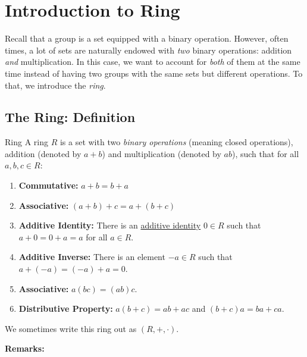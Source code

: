 \documentclass[letterpaper]{article}
\begin{document}
\section{Introduction to Ring}
Recall that a group is a set equipped with a binary operation. However, often times, a lot of sets are naturally endowed with \emph{two} binary operations: addition \emph{and} multiplication. In this case, we want to account for \emph{both} of them at the same time instead of having two groups with the same sets but different operations. To that, we introduce the \emph{ring}.

\subsection{The Ring: Definition}

\begin{definition}{Ring}{}
    A ring $R$ is a set with two \emph{binary operations} (meaning closed operations), addition (denoted by $a + b$) and multiplication (denoted by $ab$), such that for all $a, b, c \in R$:
    \begin{enumerate}
        \item \textbf{Commutative:} $a + b = b + a$
        \item \textbf{Associative:} $(a + b) + c = a + (b + c)$
        \item \textbf{Additive Identity:} There is an \underline{additive identity} $0 \in R$ such that $a + 0 = 0 + a = a$ for all $a \in R$.
        \item \textbf{Additive Inverse:} There is an element $-a \in R$ such that $a + (-a) = (-a) + a = 0$. 
        \item \textbf{Associative:} $a(bc) = (ab)c$. 
        \item \textbf{Distributive Property:} $a(b + c) = ab + ac$ and $(b + c)a = ba + ca$.  
    \end{enumerate}
    We sometimes write this ring out as $(R, +, \cdot)$. 
\end{definition}
\textbf{Remarks:}
\end{document}
